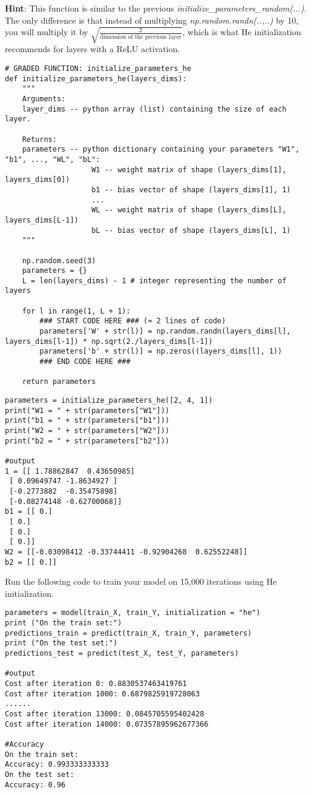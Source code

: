 {\textbf {Hint}}: This function is similar to the previous \emph{initialize\_parameters\_random(...)}. The only difference is that instead of multiplying \emph{np.random.randn(..,..)} by 10, you will multiply it by $\sqrt{\frac{2}{\text{dimension of the previous layer}}}$, which is what He initialization recommends for layers with a ReLU activation. 

\begin{verbatim}
# GRADED FUNCTION: initialize_parameters_he
def initialize_parameters_he(layers_dims):
    """
    Arguments:
    layer_dims -- python array (list) containing the size of each layer.
    
    Returns:
    parameters -- python dictionary containing your parameters "W1", "b1", ..., "WL", "bL":
                    W1 -- weight matrix of shape (layers_dims[1], layers_dims[0])
                    b1 -- bias vector of shape (layers_dims[1], 1)
                    ...
                    WL -- weight matrix of shape (layers_dims[L], layers_dims[L-1])
                    bL -- bias vector of shape (layers_dims[L], 1)
    """
    
    np.random.seed(3)
    parameters = {}
    L = len(layers_dims) - 1 # integer representing the number of layers
     
    for l in range(1, L + 1):
        ### START CODE HERE ### (≈ 2 lines of code)
        parameters['W' + str(l)] = np.random.randn(layers_dims[l], layers_dims[l-1]) * np.sqrt(2./layers_dims[l-1])
        parameters['b' + str(l)] = np.zeros((layers_dims[l], 1))
        ### END CODE HERE ###
        
    return parameters
\end{verbatim}

\begin{verbatim}
parameters = initialize_parameters_he([2, 4, 1])
print("W1 = " + str(parameters["W1"]))
print("b1 = " + str(parameters["b1"]))
print("W2 = " + str(parameters["W2"]))
print("b2 = " + str(parameters["b2"]))

#output
1 = [[ 1.78862847  0.43650985]
 [ 0.09649747 -1.8634927 ]
 [-0.2773882  -0.35475898]
 [-0.08274148 -0.62700068]]
b1 = [[ 0.]
 [ 0.]
 [ 0.]
 [ 0.]]
W2 = [[-0.03098412 -0.33744411 -0.92904268  0.62552248]]
b2 = [[ 0.]]
\end{verbatim}

Run the following code to train your model on 15,000 iterations using He initialization.
\vspace{-0.5cm}
\begin{verbatim}
parameters = model(train_X, train_Y, initialization = "he")
print ("On the train set:")
predictions_train = predict(train_X, train_Y, parameters)
print ("On the test set:")
predictions_test = predict(test_X, test_Y, parameters)

#output
Cost after iteration 0: 0.8830537463419761
Cost after iteration 1000: 0.6879825919728063
......
Cost after iteration 13000: 0.0845705595402428
Cost after iteration 14000: 0.07357895962677366

#Accuracy
On the train set:
Accuracy: 0.993333333333
On the test set:
Accuracy: 0.96

\end{verbatim}

